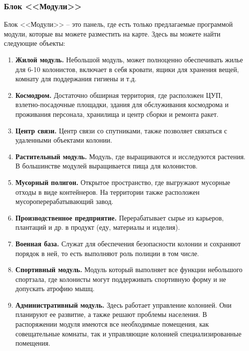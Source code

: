\subsubsection{Блок <<Модули>>}

Блок <<Модули>> -- это панель, где есть только предлагаемые программой модули, которые вы можете разместить на карте. Здесь вы можете найти следующие объекты:

\begin{enumerate}
	\item \textbf{Жилой модуль.} Небольшой модуль, может полноценно обеспечивать жилье для 6-10 колонистов, включает в себя кровати, ящики для хранения вещей, комнату для поддержания гигиены и т.д.
	
	\item \textbf{Космодром.} Достаточно обширная территория, где расположен ЦУП, взлетно-посадочные площадки, здания для обслуживания космодрома и проживания персонала, хранилища и центр сборки и ремонта ракет.
	
	\item \textbf{Центр связи.} Центр связи со спутниками, также позволяет связаться с удаленными объектами колонии.
	
	\item \textbf{Растительный модуль.} Модуль, где выращиваются и исследуются растения. В большинстве модулей выращивается пища для колонистов.
	
	\item \textbf{Мусорный полигон.} Открытое пространство, где выгружают мусорные отходы в виде контейнеров. На территории также расположен мусороперерабатывающий завод.
	
	\item \textbf{Производственное предприятие.} Перерабатывает сырье из карьеров, плантаций и др. в продукт (еду, материалы и изделия).
	
	\item \textbf{Военная база.} Служат для обеспечения безопасности колонии и сохраняют порядок в ней, то есть выполняют роль полиции в том числе.
	
	\item \textbf{Спортивный модуль.} Модуль который выполняет все функции небольшого спортзала, где колонисты могут поддерживать спортивную форму и не допускать атрофию мышц. 
	
	\item \textbf{Административный модуль.} Здесь работает управление колонией. Они планируют ее развитие, а также решают проблемы населения. В распоряжении модуля имеются все необходимые помещения, как совещательные комнаты, так и управляющие колонией специализированные помещения.
	

\end{enumerate}
